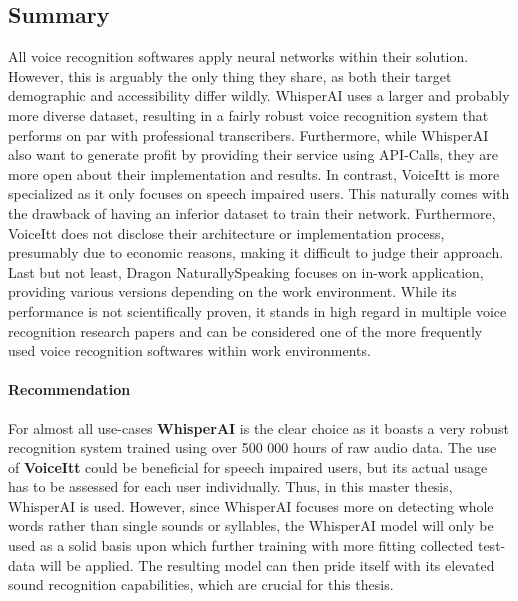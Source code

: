 \documentclass[draft,final]{vutinfth} %
\begin{document}
\subsection{Summary}
All voice recognition softwares apply neural networks within their solution. However, this is arguably the only thing they share, as both their target demographic and accessibility differ wildly. WhisperAI uses a larger and probably more diverse dataset, resulting in a fairly robust voice recognition system that performs on par with professional transcribers. Furthermore, while WhisperAI also want to generate profit by providing their service using API-Calls, they are more open about their implementation and results.
In contrast, VoiceItt is more specialized as it only focuses on speech impaired users. This naturally comes with the drawback of having an inferior dataset to train their network. Furthermore, VoiceItt does not disclose their architecture or implementation process, presumably due to economic reasons, making it difficult to judge their approach.
Last but not least, Dragon NaturallySpeaking focuses on in-work application, providing various versions depending on the work environment. While its performance is not scientifically proven, it stands in high regard in multiple voice recognition research papers and can be considered one of the more frequently used voice recognition softwares within work environments.

\paragraph{Recommendation} For almost all use-cases \textbf{WhisperAI} is the clear choice as it boasts a very robust recognition system trained using over 500 000 hours of raw audio data. The use of \textbf{VoiceItt} could be beneficial for speech impaired users, but its actual usage has to be assessed for each user individually. Thus, in this master thesis, WhisperAI is used. However, since WhisperAI focuses more on detecting whole words rather than single sounds or syllables, the WhisperAI model will only be used as a solid basis upon which further training with more fitting collected test-data will be applied. The resulting model can then pride itself with its elevated sound recognition capabilities, which are crucial for this thesis.
\end{document}

